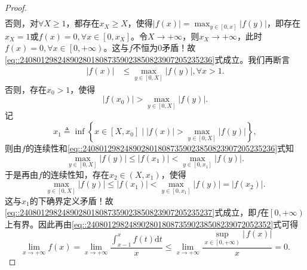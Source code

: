 \documentclass[../../main.tex]{subfiles}
\begin{document}
\begin{proof}
\begin{align}
\end{align}
否则，对$\forall X\geqslant 1$，都存在$x_X\geqslant X$，使得$\left| f\left( x \right) \right|=\max_{y\in \left[ 0,x \right]} \left| f\left( y \right) \right|$，即存在$x_X=1$或$f\left( x \right) =0,\forall x\in \left[ 0,x_X \right]$。令$X\rightarrow +\infty$，则$x_X\rightarrow +\infty$，此时$f\left( x \right) =0,\forall x\in \left[ 0,+\infty \right)$。这与$f$不恒为$0$矛盾！故\eqref{eq::2408012982489028018087359023850823907205235236}式成立。我们再断言
\begin{align}
\left| f\left( x \right) \right| &\leqslant \max_{y\in \left[ 0,X \right]} \left| f\left( y \right) \right|,\forall x>1. \label{eq::2408012982489028018087359023850823907205235237}
\end{align}
否则，存在$x_0>1$，使得
\[
\left| f\left( x_0 \right) \right|>\max_{y\in \left[ 0,X \right]} \left| f\left( y \right) \right|.
\]
记
\[
x_1\triangleq \inf\left\{ x\in \left[ X,x_0 \right] \mid \left| f\left( x \right) \right|>\max_{y\in \left[ 0,X \right]} \left| f\left( y \right) \right| \right\},
\]
则由$f$的连续性和\eqref{eq::2408012982489028018087359023850823907205235236}式知
\[
\max_{y\in \left[ 0,X \right]} \left| f\left( y \right) \right|\leqslant \left| f\left( x_1 \right) \right|<\max_{y\in \left[ 0,x_1 \right]} \left| f\left( y \right) \right|.
\]
于是再由$f$的连续性知，存在$x_2\in \left( X,x_1 \right)$，使得
\[
\max_{y\in \left[ 0,X \right]} \left| f\left( y \right) \right|\leqslant \left| f\left( x_1 \right) \right|<\max_{y\in \left[ 0,x_1 \right]} \left| f\left( y \right) \right|=\left| f\left( x_2 \right) \right|.
\]
这与$x_1$的下确界定义矛盾！故\eqref{eq::2408012982489028018087359023850823907205235237}式成立，即$f$在$\left[ 0,+\infty \right)$上有界。因此再由\eqref{eq::24080129824890280180873590238508239072052352}式可得
\[
\lim_{x\rightarrow +\infty} f\left( x \right) =\lim_{x\rightarrow +\infty} \frac{\int_{x-1}^x{f\left( t \right) \mathrm{d}t}}{x}\leqslant \lim_{x\rightarrow +\infty} \frac{\sup\limits_{x\in \left[ 0,+\infty \right)} \left| \,f\left( x \right) \right|}{x}=0.
\]

\end{proof}
\end{document}
